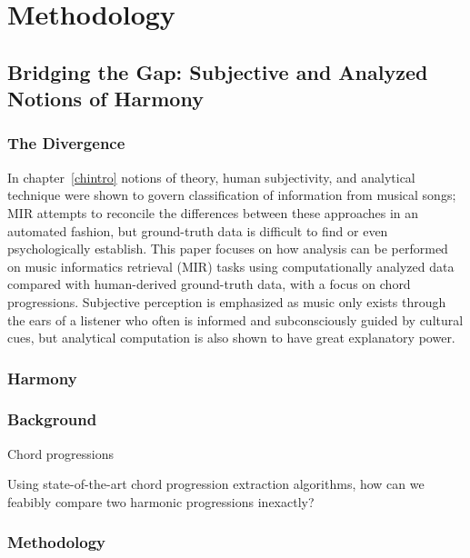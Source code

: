 \chapter{Methodology} \label{computationchordextract}

\section{Bridging the Gap: Subjective and Analyzed Notions of Harmony}

\subsection{The Divergence}

In chapter~\ref{chintro} notions of theory, human subjectivity, and analytical technique were shown to govern classification of information from musical songs; MIR attempts to reconcile the differences between these approaches in an automated fashion, but ground-truth data is difficult to find or even psychologically establish. This paper focuses on how analysis can be performed on music informatics retrieval (MIR) tasks using computationally analyzed data compared with human-derived ground-truth data, with a focus on chord progressions. Subjective perception is emphasized as music only exists through the ears of a listener who often is informed and subconsciously guided by cultural cues, but analytical computation is also shown to have great explanatory power. 


\subsection{Harmony}

\subsection{Background}

Chord progressions

\item Using state-of-the-art chord progression extraction algorithms, how can we feabibly compare two harmonic progressions inexactly?

\subsection{Methodology}

